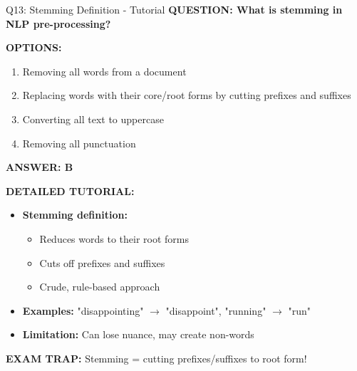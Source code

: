 \documentclass[8pt]{beamer}
\begin{document}
	\begin{frame}{Q13: Stemming Definition - Tutorial}
		\fontsize{6.5}{7.5}\selectfont
		\textbf{QUESTION: What is stemming in NLP pre-processing?}
		
		\vspace{0.1cm}
		\textbf{OPTIONS:}
		\begin{enumerate}
			\item Removing all words from a document
			\item Replacing words with their core/root forms by cutting prefixes and suffixes
			\item Converting all text to uppercase
			\item Removing all punctuation
		\end{enumerate}
		
		\vspace{0.1cm}
		\textcolor{myblue}{\textbf{ANSWER: B}}
		
		\vspace{0.1cm}
		\textbf{DETAILED TUTORIAL:}
		\begin{itemize}
			\item \textbf{Stemming definition:}
			\begin{itemize}
				\item Reduces words to their root forms
				\item Cuts off prefixes and suffixes
				\item Crude, rule-based approach
			\end{itemize}
			\item \textbf{Examples:} "disappointing" $\to$ "disappoint", "running" $\to$ "run"
			\item \textbf{Limitation:} Can lose nuance, may create non-words
		\end{itemize}
		
		\textcolor{myred}{\textbf{EXAM TRAP:}} Stemming = \textcolor{myblue}{cutting prefixes/suffixes to root form}!
	\end{frame}
	
\end{document}
